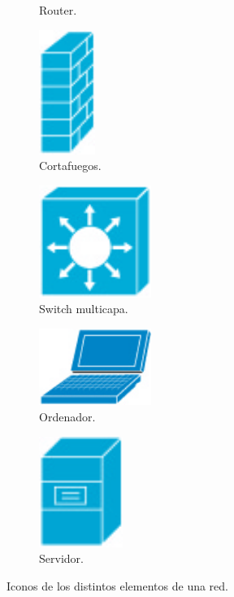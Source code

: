 \begin{figure}
\begin{subfigure}{0.25\textwidth}
        \caption{Router.}
    \end{subfigure}
    \begin{subfigure}{0.25\textwidth}
        \centering
        \includegraphics[width=0.2\textwidth]{./Iconos/firewall.jpg}
        \caption{Cortafuegos.}
    \end{subfigure}
    \begin{subfigure}{0.25\textwidth}
        \centering
        \includegraphics[width=0.4\textwidth]{./Iconos/switch_multicapa.jpg}
        \caption{Switch multicapa.}
    \end{subfigure}
    \begin{subfigure}{0.25\textwidth}
        \centering
        \includegraphics[width=0.4\textwidth]{./Iconos/laptop.jpg}
        \caption{Ordenador.}
    \end{subfigure}
    \begin{subfigure}{0.25\textwidth}
        \centering
        \includegraphics[width=0.3\textwidth]{./Iconos/server.jpg}
        \caption{Servidor.}
    \end{subfigure}
    \caption{Iconos de los distintos elementos de una red.}
    \label{fig:iconos}
\end{figure}


